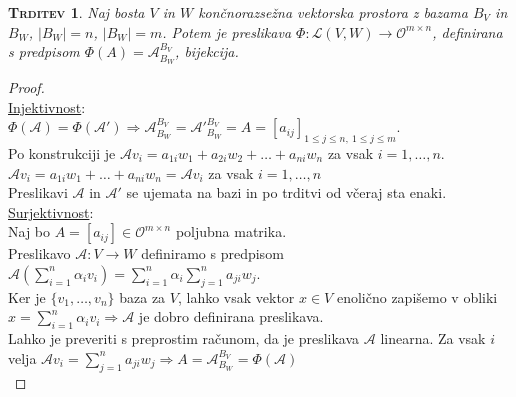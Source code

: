 \documentclass[a4paper,12pt]{article}
\newtheorem*{trditev}{\textsc{Trditev}}
\begin{document}
\newpage 

\begin{trditev}
	Naj bosta $V$ in $W$ končnorazsežna vektorska prostora z bazama $B_V$ in $B_W$, \linebreak  $|B_W|=n$,  $|B_W|=m$. Potem je preslikava $\Phi: \mathcal{L}(V,W)\to \mathcal{O}^{m\times n}$, definirana s   \linebreak predpisom $\Phi(A)=\mathcal{A}^{B_V}_{B_W}$, bijekcija. \\
\end{trditev}
\begin{proof} ~ \\

	\underline{Injektivnost}:\\

	$\Phi(\mathcal{A})=\Phi(\mathcal{A}')\Rightarrow\mathcal{A}^{B_V}_{B_W}=\mathcal{A}'^{B_V}_{B_W}=A=[a_{ij}]_{1\leq j \leq n,~1\leq j \leq m}$. \\

	Po konstrukciji je $\mathcal{A}v_i=a_{1i}w_1+a_{2i}w_2+\ldots+a_{ni}w_n$ za vsak $i=1,\ldots,n$.\\

	$\mathcal{A}v_i=a_{1i}w_1+\ldots+a_{ni}w_n=\mathcal{A}v_i$ za vsak $i=1,\ldots,n$\\

	Preslikavi $\mathcal{A}$ in $\mathcal{A}'$ se ujemata na bazi in po trditvi od včeraj sta enaki. \\

	\underline{Surjektivnost}:\\

	Naj bo $A=[a_{ij}]\in \mathcal{O}^{m\times n}$ poljubna matrika. \\

	Preslikavo $\mathcal{A}:V\to W$ definiramo s predpisom $\mathcal{A}(\sum_{i=1}^n \alpha_i v_i)=\sum_{i=1}^n \alpha_i \sum_{j=1}^n a_{ji}w_j$.\\

	Ker je $\{v_1,\ldots,v_n\}$ baza za $V$, lahko vsak vektor $x\in V$ enolično zapišemo v obliki \linebreak  $x=\sum_{i=1}^n \alpha_i v_i \Rightarrow \mathcal{A}$ je dobro definirana preslikava. \\
	
	Lahko je preveriti s preprostim računom, da je preslikava $\mathcal{A}$ linearna. Za vsak $i$ velja $\mathcal{A}v_i=\sum_{j=1}^n a_{ji}w_j \Rightarrow A=\mathcal{A}^{B_V}_{B_W}=\Phi(\mathcal{A})$\\
\end{proof}
\end{document}
